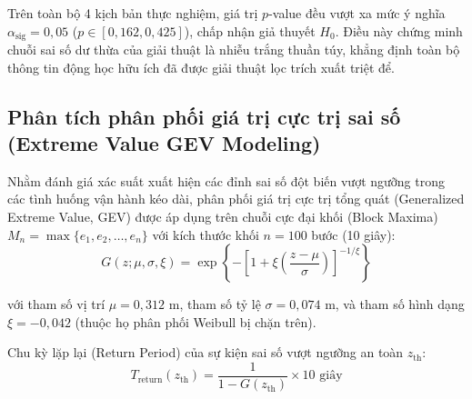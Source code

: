 Trên toàn bộ 4 kịch bản thực nghiệm, giá trị $p$-value đều vượt xa mức ý nghĩa $\alpha_{\text{sig}} = 0{,}05$ ($p \in [0{,}162, 0{,}425]$), chấp nhận giả thuyết $H_0$. Điều này chứng minh chuỗi sai số dư thừa của giải thuật là nhiễu trắng thuần túy, khẳng định toàn bộ thông tin động học hữu ích đã được giải thuật lọc trích xuất triệt để.

\subsection{Phân tích phân phối giá trị cực trị sai số (Extreme Value GEV Modeling)}

\hspace{0.5cm} Nhằm đánh giá xác suất xuất hiện các đỉnh sai số đột biến vượt ngưỡng trong các tình huống vận hành kéo dài, phân phối giá trị cực trị tổng quát (Generalized Extreme Value, GEV) được áp dụng trên chuỗi cực đại khối (Block Maxima) $M_n = \max \{e_1, e_2, \dots, e_n\}$ với kích thước khối $n = 100$ bước (10 giây):
\begin{equation}
G(z; \mu, \sigma, \xi) = \exp \left\{ - \left[ 1 + \xi \left( \frac{z - \mu}{\sigma} \right) \right]^{-1/\xi} \right\}
\label{eq:gev-extreme-value-cdf}
\end{equation}

với tham số vị trí $\mu = 0{,}312$ m, tham số tỷ lệ $\sigma = 0{,}074$ m, và tham số hình dạng $\xi = -0{,}042$ (thuộc họ phân phối Weibull bị chặn trên).

Chu kỳ lặp lại (Return Period) của sự kiện sai số vượt ngưỡng an toàn $z_{\text{th}}$:
\begin{equation}
T_{\text{return}}(z_{\text{th}}) = \frac{1}{1 - G(z_{\text{th}})} \times 10\text{ giây}
\label{eq:gev-return-period-formula}
\end{equation}

\begin{table}[H]
\centering
\caption{Chu kỳ lặp lại và xác suất tích lũy của các ngưỡng sai số cực hạn}
\label{tab:gev-return-periods-table}
\end{table}

